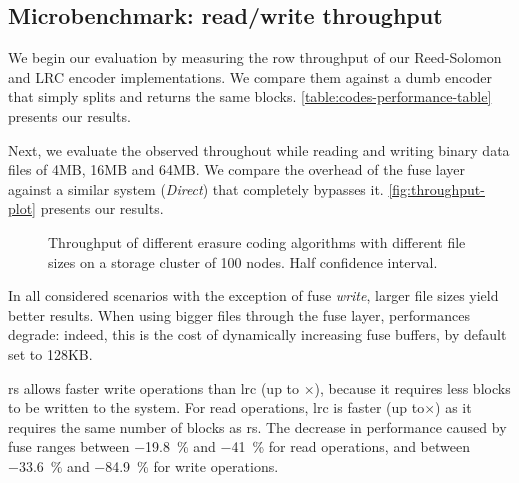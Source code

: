 \begin{table*}
    \centering
    \caption{Workload characterisation and erasure-coding overhead. }
    
    \label{fig:overhead-table}
\end{table*}

\subsection{Microbenchmark: read/write throughput}%
\label{subsec:rw-perf}
We begin our evaluation by measuring the row throughput of our Reed-Solomon and LRC encoder implementations. 
We compare them against a dumb encoder that simply splits and returns the same blocks. 
\autoref{table:codes-performance-table} presents our results. 

\begin{table}
    \centering
    \caption{Performance of each coding algorithm in isolation in \si{\mega\byte\per\second}}
    
    \label{table:codes-performance-table}
\end{table}

Next, we evaluate the observed throughout while reading and writing binary data files of 4MB, 16MB and 64MB. 
We compare the overhead of the \ac{fuse} layer against a similar system (\textit{Direct}) that completely bypasses it.
\autoref{fig:throughput-plot} presents our results.
\begin{figure*}[t]
    \centering
    
    \caption{Throughput of different erasure coding algorithms with different file sizes on a storage cluster of 100 nodes. Half confidence interval.}
    \label{fig:throughput-plot}
\end{figure*}

In all considered scenarios with the exception of \ac{fuse} \textit{write}, larger file sizes yield better results.
When using bigger files through the \ac{fuse} layer, performances degrade: indeed, this is the cost of dynamically increasing \ac{fuse} buffers, by default set to 128KB.

\ac{rs} allows faster write operations than \ac{lrc} (up to $\times$), because it requires less blocks to be written to the system.
For read operations, \ac{lrc} is faster (up to$\times$) as it requires the same number of blocks as \ac{rs}.
The decrease in performance caused by \ac{fuse} ranges between \SI{-19.8}{\percent} and \SI{-41}{\percent} for read operations, and between \SI{-33.6}{\percent} and \SI{-84.9}{\percent} for write operations.



